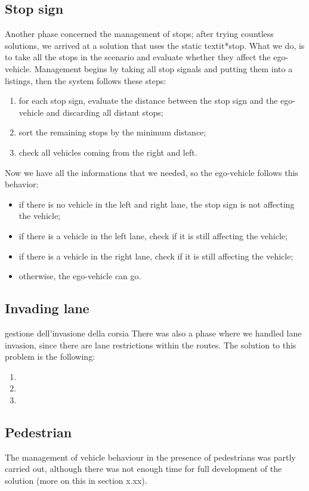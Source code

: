 \documentclass{article}
\begin{document}
\subsection{Stop sign}
Another phase concerned the management of stops; after trying countless solutions, we arrived at a solution that 
uses the static textit{*stop}. What we do, is to take all the stops in the scenario and evaluate whether they 
affect the ego-vehicle. 
Management begins by taking all stop signals and putting them into a listings, then the system follows these steps:
\begin{enumerate}
    \item for each stop sign, evaluate the distance between the stop sign and the ego-vehicle and discarding all distant stops;
    \item sort the remaining stops by the minimum distance;
    \item check all vehicles coming from the right and left.
\end{enumerate}
Now we have all the informations that we needed, so the ego-vehicle follows this behavior:
\begin{itemize}
    \item if there is no vehicle in the left and right lane, the stop sign is not affecting the vehicle;
    \item if there is a vehicle in the left lane, check if it is still affecting the vehicle;
    \item if there is a vehicle in the right lane, check if it is still affecting the vehicle;
    \item otherwise, the ego-vehicle can go.
\end{itemize}
 

\subsection{Invading lane}
gestione dell'invasione della corsia
There was also a phase where we handled lane invasion, since there are lane restrictions within the routes. 
The solution to this problem is the following:
\begin{enumerate}
    \item 
    \item 
    \item 
\end{enumerate}

\subsection{Pedestrian}
The management of vehicle behaviour in the presence of pedestrians was partly carried out, 
although there was not enough time for full development of the solution (more on this in section x.xx). 
\end{document}
